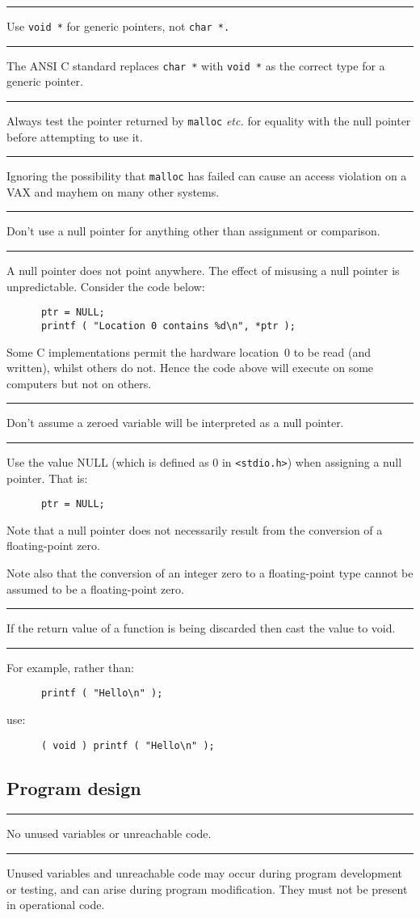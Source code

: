 \documentclass[twoside,11pt]{article}
\newcounter{sruleno}
\newcommand{\srule}[1]{
    \addtocounter{sruleno}{1}
    \goodbreak
    \rule[0.5ex]{\textwidth}{0.3mm}
    {\Large #1 \hfill {\thesruleno}}
    \rule[0.5ex]{\textwidth}{0.1mm}
}
\newcommand{\srule}[1]{
       \addtocounter{sruleno}{1}
       \begin{rawhtml} <HR> \end{rawhtml}
       {\Large \thesruleno}~~~~{\Large #1}
       \begin{rawhtml} <HR> \end{rawhtml}
       \end{tabular}
  }
\begin{document}
\srule{Use {\tt void *} for generic pointers, not {\tt char *.}}
The ANSI C standard replaces {\tt char~*} with {\tt void~*} as the 
correct type for a generic pointer.


\srule{Always test the pointer returned by {\tt malloc} {\it etc.} 
for equality with   the null pointer before attempting to use it.}
Ignoring the possibility that {\tt malloc} has failed 
can cause an access violation 
on a  VAX and mayhem on many other systems.

\srule{Don't use a null pointer for anything other than assignment or 
comparison.}
A null pointer does not point anywhere. The effect of misusing a
null pointer is unpredictable. 
Consider the code below:
\begin{verbatim}
      ptr = NULL;
      printf ( "Location 0 contains %d\n", *ptr );
\end{verbatim}
Some C implementations permit the 
hardware location~0 to be read (and written), whilst others do not.
Hence the code above will execute on some computers but not on others.

\srule{Don't assume a zeroed variable will be interpreted as a null pointer.}
Use the value NULL (which is defined as 0 in \verb!<stdio.h>!)
when assigning a null pointer. That is:  
\begin{verbatim}
      ptr = NULL;
\end{verbatim}
Note that a null pointer does not necessarily
result from the conversion of a floating-point zero. 

Note also that the conversion of an integer zero to a floating-point type 
cannot be assumed to be a floating-point zero.

\srule{If the return value of a function is being discarded then 
cast the  value to void.}
For example, rather than:
\begin{verbatim}
      printf ( "Hello\n" );
\end{verbatim}
use:
\begin{verbatim}
      ( void ) printf ( "Hello\n" );
\end{verbatim}

\newpage
\subsection{Program design}

\srule{No unused variables or unreachable code.}
Unused variables and unreachable code may occur during program development or 
testing, and can arise during program modification.  They must not be present 
in operational code.
\end{document}
